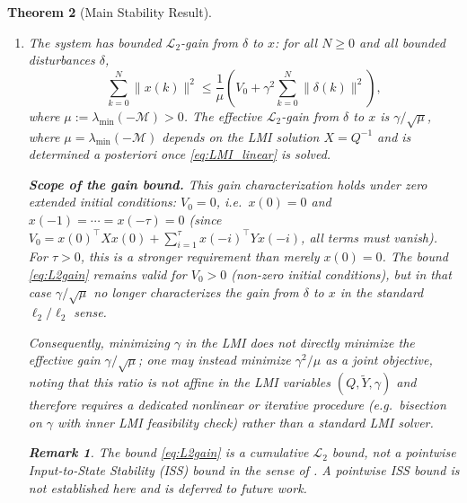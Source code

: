 \documentclass[10pt]{amsart}
\numberwithin{equation}{section}
\newtheorem{theorem}{Theorem}[section]
\newtheorem{remark}[theorem]{Remark}
\begin{document}
\begin{theorem}[Main Stability Result]
\begin{enumerate}
  \item[(b)] The system has bounded $\mathcal{L}_2$-gain from $\delta$ to $x$: for all
             $N \geq 0$ and all bounded disturbances $\delta$,
             \begin{equation}\label{eq:L2gain}
               \sum_{k=0}^{N}\|x(k)\|^2 \leq \frac{1}{\mu}\left(V_0
               + \gamma^2 \sum_{k=0}^{N}\|\delta(k)\|^2\right),
             \end{equation}
             where $\mu := \lambda_{\min}(-\mathcal{M}) > 0$. The effective
             $\mathcal{L}_2$-gain from $\delta$ to $x$ is $\gamma/\sqrt{\mu}$,
             where $\mu = \lambda_{\min}(-\mathcal{M})$ depends on the LMI solution
             $X = Q^{-1}$ and is determined \emph{a posteriori} once
             \eqref{eq:LMI_linear} is solved.

             \textbf{Scope of the gain bound.} This gain characterization holds under
             \emph{zero extended initial conditions}: $V_0 = 0$, i.e.\
             $x(0) = 0$ \emph{and} $x(-1) = \cdots = x(-\tau) = 0$ (since $V_0 =
             x(0)^\top X x(0) + \sum_{i=1}^\tau x(-i)^\top Y x(-i)$, all terms must
             vanish). For $\tau > 0$, this is a stronger requirement than merely
             $x(0)=0$. The bound \eqref{eq:L2gain} remains valid for $V_0 > 0$
             (non-zero initial conditions), but in that case $\gamma/\sqrt{\mu}$ no
             longer characterizes the gain from $\delta$ to $x$ in the standard
             $\ell_2/\ell_2$ sense.

             Consequently, minimizing $\gamma$ in the LMI does not directly minimize
             the effective gain $\gamma/\sqrt{\mu}$; one may instead minimize
             $\gamma^2/\mu$ as a joint objective, noting that this ratio is not affine
             in the LMI variables $(Q, \tilde{Y}, \gamma)$ and therefore requires a
             dedicated nonlinear or iterative procedure (e.g.\ bisection on $\gamma$
             with inner LMI feasibility check) rather than a standard LMI solver.

             \begin{remark}
               The bound \eqref{eq:L2gain} is a \emph{cumulative} $\mathcal{L}_2$
               bound, not a pointwise Input-to-State Stability (ISS) bound in the
               sense of \cite{JiangWang2001}. A pointwise ISS bound is not established
               here and is deferred to future work.
             \end{remark}


\end{enumerate}
\end{theorem}
\end{document}
